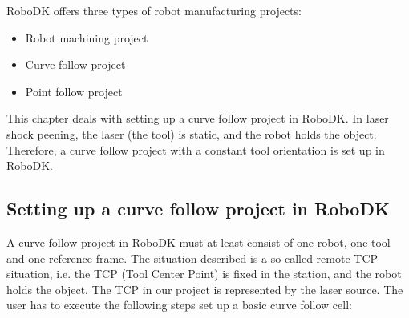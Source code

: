 RoboDK offers three types of robot manufacturing projects:

\begin{itemize}

    \item Robot machining project
    \item Curve follow project 
    \item Point follow project 

\end{itemize}

This chapter deals with setting up a curve follow project in RoboDK. In laser shock peening, the laser (the tool) is static, and the robot holds the object. Therefore, a curve follow project with a constant tool orientation is set up in RoboDK.

\subsection{Setting up a curve follow project in RoboDK}

A curve follow project in RoboDK must at least consist of one robot, one tool and one reference frame. The situation described is a so-called remote TCP situation, i.e. the TCP (Tool Center Point) is fixed in the station, and the robot holds the object. The TCP in our project is represented by the laser source. 
The user has to execute the following steps set up a basic curve follow cell: 

